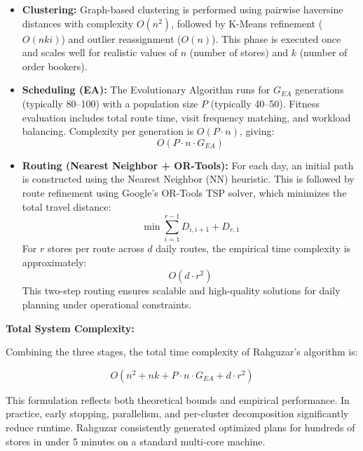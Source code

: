 \begin{itemize}
  \item \textbf{Clustering:} Graph-based clustering is performed using pairwise haversine distances with complexity $O(n^2)$, followed by K-Means refinement ($O(nki)$) and outlier reassignment ($O(n)$). This phase is executed once and scales well for realistic values of $n$ (number of stores) and $k$ (number of order bookers).

  \item \textbf{Scheduling (EA):} The Evolutionary Algorithm runs for $G_{EA}$ generations (typically 80–100) with a population size $P$ (typically 40–50). Fitness evaluation includes total route time, visit frequency matching, and workload balancing. Complexity per generation is $O(P \cdot n)$, giving:
  \[
  O(P \cdot n \cdot G_{EA})
  \]

  \item \textbf{Routing (Nearest Neighbor + OR-Tools):} For each day, an initial path is constructed using the Nearest Neighbor (NN) heuristic. This is followed by route refinement using Google's OR-Tools TSP solver, which minimizes the total travel distance:
\[
\min \sum_{i=1}^{r-1} D_{i,i+1} + D_{r,1}
\]
For $r$ stores per route across $d$ daily routes, the empirical time complexity is approximately:
\[
O(d \cdot r^2)
\]
This two-step routing ensures scalable and high-quality solutions for daily planning under operational constraints.
\end{itemize}

\textbf{Total System Complexity:}

Combining the three stages, the total time complexity of Rahguzar’s algorithm is:

\[
O(n^2 + nk + P \cdot n \cdot G_{EA} + d \cdot r^2)
\]



This formulation reflects both theoretical bounds and empirical performance. In practice, early stopping, parallelism, and per-cluster decomposition significantly reduce runtime. Rahguzar consistently generated optimized plans for hundreds of stores in under 5 minutes on a standard multi-core machine.
